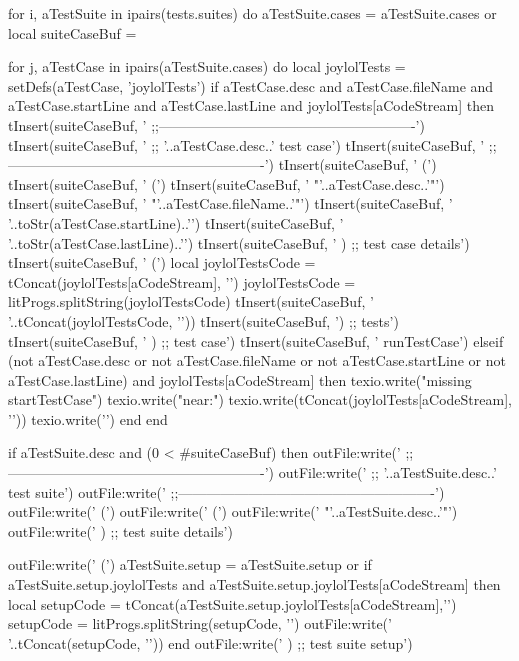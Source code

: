   for i, aTestSuite in ipairs(tests.suites) do
    aTestSuite.cases = aTestSuite.cases or { }
    local suiteCaseBuf = { }

    for j, aTestCase in ipairs(aTestSuite.cases) do
      local joylolTests     = setDefs(aTestCase, 'joylolTests')
      if aTestCase.desc and
        aTestCase.fileName and
        aTestCase.startLine and
        aTestCase.lastLine and
        joylolTests[aCodeStream] then
        tInsert(suiteCaseBuf, '    ;;-------------------------------------------------------\n')
        tInsert(suiteCaseBuf, '    ;; '..aTestCase.desc..' test case\n')
        tInsert(suiteCaseBuf, '    ;;-------------------------------------------------------\n')
        tInsert(suiteCaseBuf, '    (\n')
        tInsert(suiteCaseBuf, '      (\n')
        tInsert(suiteCaseBuf, '        "'..aTestCase.desc..'"\n')
        tInsert(suiteCaseBuf, '        "'..aTestCase.fileName..'"\n')
        tInsert(suiteCaseBuf, '        '..toStr(aTestCase.startLine)..'\n')
        tInsert(suiteCaseBuf, '        '..toStr(aTestCase.lastLine)..'\n')
        tInsert(suiteCaseBuf, '      ) ;; test case details\n\n')
        tInsert(suiteCaseBuf, '      (\n  ')
        local joylolTestsCode = tConcat(joylolTests[aCodeStream], '\n')
        joylolTestsCode       = litProgs.splitString(joylolTestsCode)
        tInsert(suiteCaseBuf, '    '..tConcat(joylolTestsCode, '\n      '))
        tInsert(suiteCaseBuf, '\n      ) ;; tests\n\n')
        tInsert(suiteCaseBuf, '    ) ;; test case\n')
        tInsert(suiteCaseBuf, '    runTestCase\n\n')
      elseif (not aTestCase.desc or
        not aTestCase.fileName or
        not aTestCase.startLine or
        not aTestCase.lastLine) and
        joylolTests[aCodeStream] then
        texio.write("\nERROR missing \\startTestCase\n")
        texio.write("near:\n")
        texio.write(tConcat(joylolTests[aCodeStream], '\n'))
        texio.write('\n')
      end
    end

    if aTestSuite.desc and (0 < #suiteCaseBuf) then
      outFile:write('  ;;-------------------------------------------------------\n')
      outFile:write('  ;; '..aTestSuite.desc..' test suite\n')
      outFile:write('  ;;-------------------------------------------------------\n')
      outFile:write('  (\n')
      outFile:write('    (\n')
      outFile:write('      "'..aTestSuite.desc..'"\n')
      outFile:write('    ) ;; test suite details\n\n')

      outFile:write('    (\n')
      aTestSuite.setup = aTestSuite.setup or { }
      if aTestSuite.setup.joylolTests and
        aTestSuite.setup.joylolTests[aCodeStream] then
        local setupCode = tConcat(aTestSuite.setup.joylolTests[aCodeStream],'\n  ')
        setupCode = litProgs.splitString(setupCode, '\n')
        outFile:write('    '..tConcat(setupCode, '\n    '))
      end
      outFile:write('    ) ;; test suite setup\n\n')

